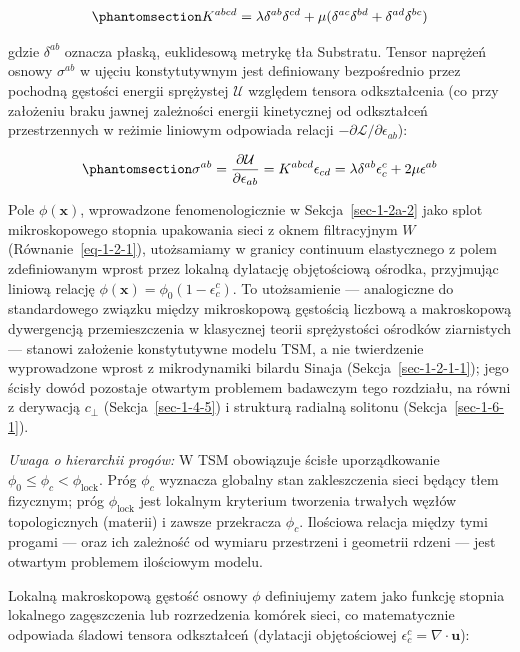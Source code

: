 \documentclass[
  polish,
  letterpaper,
  DIV=11,
  numbers=noendperiod,
  oneside]{scrartcl}
\begin{document}
\begin{equation}\protect\phantomsection\label{eq-1-5-3}{K^{abcd} = \lambda \delta^{ab}\delta^{cd} + \mu (\delta^{ac}\delta^{bd} + \delta^{ad}\delta^{bc})}\end{equation}

gdzie \(\delta^{ab}\) oznacza płaską, euklidesową metrykę tła Substratu.
Tensor naprężeń osnowy \(\sigma^{ab}\) w ujęciu konstytutywnym jest
definiowany bezpośrednio przez pochodną gęstości energii sprężystej
\(\mathcal{U}\) względem tensora odkształcenia (co przy założeniu braku
jawnej zależności energii kinetycznej od odkształceń przestrzennych w
reżimie liniowym odpowiada relacji
\(-\partial \mathcal{L} / \partial \epsilon_{ab}\)):

\begin{equation}\protect\phantomsection\label{eq-1-5-4}{\sigma^{ab} = \frac{\partial \mathcal{U}}{\partial \epsilon_{ab}} = K^{abcd} \epsilon_{cd} = \lambda \delta^{ab} \epsilon^c_c + 2\mu \epsilon^{ab}}\end{equation}

Pole \(\phi(\mathbf{x})\), wprowadzone fenomenologicznie w
Sekcja~\ref{sec-1-2a-2} jako splot mikroskopowego stopnia upakowania
sieci z oknem filtracyjnym \(W\) (Równanie~\ref{eq-1-2-1}), utożsamiamy
w granicy continuum elastycznego z polem zdefiniowanym wprost przez
lokalną dylatację objętościową ośrodka, przyjmując liniową relację
\(\phi(\mathbf{x}) = \phi_0(1 - \epsilon^c_c)\). To utożsamienie ---
analogiczne do standardowego związku między mikroskopową gęstością
liczbową a makroskopową dywergencją przemieszczenia w klasycznej teorii
sprężystości ośrodków ziarnistych --- stanowi założenie konstytutywne
modelu TSM, a nie twierdzenie wyprowadzone wprost z mikrodynamiki
bilardu Sinaja (Sekcja~\ref{sec-1-2-1-1}); jego ścisły dowód pozostaje
otwartym problemem badawczym tego rozdziału, na równi z derywacją
\(c_\perp\) (Sekcja~\ref{sec-1-4-5}) i strukturą radialną solitonu
(Sekcja~\ref{sec-1-6-1}).

\emph{Uwaga o hierarchii progów:} W TSM obowiązuje ścisłe uporządkowanie
\(\phi_0 \le \phi_c < \phi_\text{lock}\). Próg \(\phi_c\) wyznacza
globalny stan zakleszczenia sieci będący tłem fizycznym; próg
\(\phi_\text{lock}\) jest lokalnym kryterium tworzenia trwałych węzłów
topologicznych (materii) i zawsze przekracza \(\phi_c\). Ilościowa
relacja między tymi progami --- oraz ich zależność od wymiaru
przestrzeni i geometrii rdzeni --- jest otwartym problemem ilościowym
modelu.

Lokalną makroskopową gęstość osnowy \(\phi\) definiujemy zatem jako
funkcję stopnia lokalnego zagęszczenia lub rozrzedzenia komórek sieci,
co matematycznie odpowiada śladowi tensora odkształceń (dylatacji
objętościowej \(\epsilon^c_c = \nabla \cdot \mathbf{u}\)):
\end{document}
